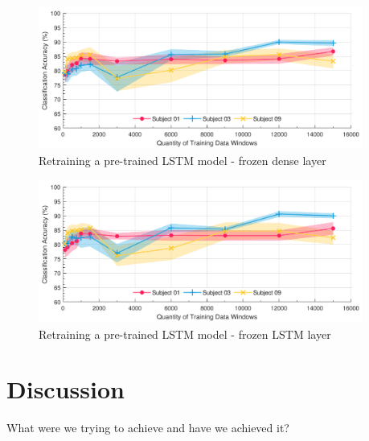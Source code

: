 
\begin{figure}[htbp]
    \centering
    \includegraphics[width=0.95\textwidth]{content/5-Personalisation/ch5_frozen_dense_layer_accuracy.pdf}
    \caption[Retraining a pre-trained LSTM model]{Retraining a pre-trained LSTM model - frozen dense layer}
    \label{fig:ch5_freezing_dense_layer}
\end{figure}


\begin{figure}[htbp]
    \centering
    \includegraphics[width=0.95\textwidth]{content/5-Personalisation/ch5_frozen_lstm_layer_accuracy.pdf}
    \caption[Retraining a pre-trained LSTM model]{Retraining a pre-trained LSTM model - frozen LSTM layer}
    \label{fig:ch5_freezing_LSTM_layer}
\end{figure}

\section{Discussion}
\label{sec:personalisation-discussion}
What were we trying to achieve and have we achieved it?

